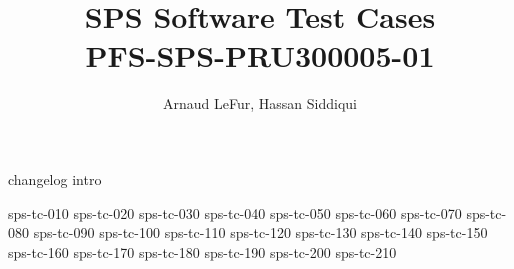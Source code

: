 \documentclass[12pt]{article}
\begin{document}
\title{\acrshort{SPS} Software Test Cases \\ \large PFS-SPS-PRU300005-01}
\author{Arnaud LeFur, Hassan Siddiqui}
\maketitle

\tableofcontents
\newpage

%
%
{changelog}
{intro}
\newpage

%
%
{sps-tc-010}
\newpage
{sps-tc-020}
\newpage
{sps-tc-030}
\newpage
{sps-tc-040}
\newpage
{sps-tc-050}
\newpage
{sps-tc-060}
\newpage
{sps-tc-070}
\newpage
{sps-tc-080}
\newpage
{sps-tc-090}
\newpage
{sps-tc-100}
\newpage
{sps-tc-110}
\newpage
{sps-tc-120}
\newpage
{sps-tc-130}
\newpage
{sps-tc-140}
\newpage
{sps-tc-150}
\newpage
{sps-tc-160}
\newpage
{sps-tc-170}
\newpage
{sps-tc-180}
\newpage
{sps-tc-190}
\newpage
{sps-tc-200}
\newpage
{sps-tc-210}
\newpage
%
%
\printglossary[type=\acronymtype]
\printglossary
\end{document}
